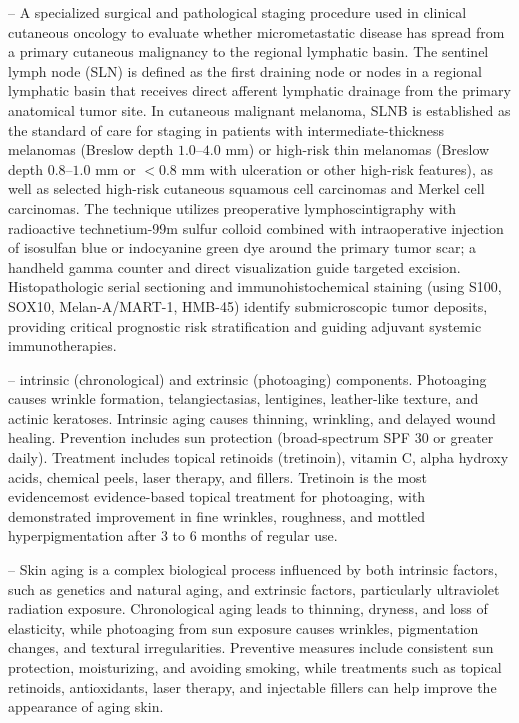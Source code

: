 -- A specialized surgical and pathological staging procedure used in clinical cutaneous oncology to evaluate whether micrometastatic disease has spread from a primary cutaneous malignancy to the regional lymphatic basin. The sentinel lymph node (SLN) is defined as the first draining node or nodes in a regional lymphatic basin that receives direct afferent lymphatic drainage from the primary anatomical tumor site. In cutaneous malignant melanoma, SLNB is established as the standard of care for staging in patients with intermediate-thickness melanomas (Breslow depth $1.0\text{--}4.0\text{ mm}$) or high-risk thin melanomas (Breslow depth $0.8\text{--}1.0\text{ mm}$ or $<0.8\text{ mm}$ with ulceration or other high-risk features), as well as selected high-risk cutaneous squamous cell carcinomas and Merkel cell carcinomas. The technique utilizes preoperative lymphoscintigraphy with radioactive technetium-99m sulfur colloid combined with intraoperative injection of isosulfan blue or indocyanine green dye around the primary tumor scar; a handheld gamma counter and direct visualization guide targeted excision. Histopathologic serial sectioning and immunohistochemical staining (using S100, SOX10, Melan-A/MART-1, HMB-45) identify submicroscopic tumor deposits, providing critical prognostic risk stratification and guiding adjuvant systemic immunotherapies.

-- intrinsic (chronological) and extrinsic (photoaging) components. Photoaging causes wrinkle formation, telangiectasias, lentigines, leather-like texture, and actinic keratoses. Intrinsic aging causes thinning, wrinkling, and delayed wound healing. Prevention includes sun protection (broad-spectrum SPF 30 or greater daily). Treatment includes topical retinoids (tretinoin), vitamin C, alpha hydroxy acids, chemical peels, laser therapy, and fillers. Tretinoin is the most evidencemost evidence-based topical treatment for photoaging, with demonstrated improvement in fine wrinkles, roughness, and mottled hyperpigmentation after 3 to 6 months of regular use.

-- Skin aging is a complex biological process influenced by both intrinsic factors, such as genetics and natural aging, and extrinsic factors, particularly ultraviolet radiation exposure. Chronological aging leads to thinning, dryness, and loss of elasticity, while photoaging from sun exposure causes wrinkles, pigmentation changes, and textural irregularities. Preventive measures include consistent sun protection, moisturizing, and avoiding smoking, while treatments such as topical retinoids, antioxidants, laser therapy, and injectable fillers can help improve the appearance of aging skin.

